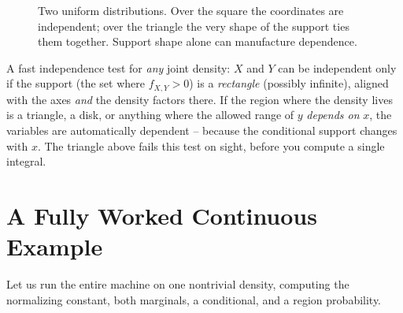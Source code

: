 \begin{figure}[H]
\centering
{}
\caption{Two uniform distributions. Over the square the coordinates are
independent; over the triangle the very shape of the support ties them together.
Support shape alone can manufacture dependence.}
\label{ch13:fig-square-triangle}
\end{figure}

\begin{trapbox}
A fast independence test for \emph{any} joint density: $X$ and $Y$ can be
independent only if the support (the set where $f_{X,Y}>0$) is a \emph{rectangle}
(possibly infinite), aligned with the axes \emph{and} the density factors there.
If the region where the density lives is a triangle, a disk, or anything where the
allowed range of $y$ \emph{depends on} $x$, the variables are automatically
dependent -- because the conditional support changes with $x$. The triangle above
fails this test on sight, before you compute a single integral.
\end{trapbox}

\section{A Fully Worked Continuous Example}
\label{ch13:worked-continuous}

Let us run the entire machine on one nontrivial density, computing the
normalizing constant, both marginals, a conditional, and a region probability.

